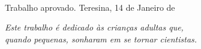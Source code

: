 \documentclass[
	12pt,				%
	openright,			%
	oneside,			%
	a4paper,			%
	chapter=TITLE,		%
	english,			%
	brazil,				%
	]{abntex2}
\renewcommand{\ABNTEXchapterfont}{\normalfont}
\begin{document}
\begin{folhadeaprovacao}

  \begin{center}
    {\ABNTEXchapterfont\bfseries\Large \imprimirtitulo}\\
    \vspace*{\fill}
    {\ABNTEXchapterfont\large \imprimirautor}
    
    \vspace*{\fill}\vspace*{\fill}
    \hspace{.45\textwidth}
    \begin{minipage}{.5\textwidth}
        \imprimirpreambulo
    \end{minipage}%
    \vspace*{\fill}
   
   \ABNTEXchapterfont     
   {Trabalho aprovado. Teresina, 14 de Janeiro de \imprimirdata}
   \end{center}
   


  
\end{folhadeaprovacao}


\begin{dedicatoria}
  \vspace*{\fill}
   \centering
   \noindent
   \textit{ Este trabalho é dedicado às crianças adultas que,\\
   quando pequenas, sonharam em se tornar cientistas.} 
   \vspace*{\fill}
\end{dedicatoria}
\end{document}
